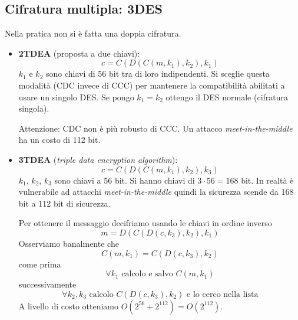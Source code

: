 \subsection{Cifratura multipla: 3DES}
Nella pratica non si è fatta una doppia cifratura. 
\begin{itemize}
    \item \textbf{2TDEA} (proposta a due chiavi):
        $$ c = C\left(D(C(m, k_1), k_2), k_1\right) $$
        $k_1$ e $k_2$ sono chiavi di 56 bit tra di loro indipendenti. Si sceglie questa modalità (CDC invece di CCC) per mantenere la compatibilità abilitati a usare un singolo DES. Se pongo $k_1 = k_2$ ottengo il DES normale (cifratura singola).
        
        {Attenzione}: CDC non è più robusto di CCC. Un attacco \emph{meet-in-the-middle} ha un costo di 112 bit.
    \item \textbf{3TDEA} (\textit{triple data encryption algorithm}):
        $$ c = C(D(C(m, k_1), k_2), k_3) $$
        $k_1$, $k_2$, $k_3$ sono chiavi a 56 bit. Si hanno chiavi di $3 \cdot 56 = 168$ bit. In realtà è vulnerabile ad attacchi \textit{meet-in-the-middle} quindi la sicurezza scende da 168 bit a 112 bit di sicurezza.
        
        Per ottenere il messaggio decifriamo usando le chiavi in ordine inverso
        $$m=D\left(C(D(c,k_3),k_2),k_1\right)$$
        Osserviamo banalmente che
        $$C(m,k_1)=C(D(c,k_3),k_2)$$
        come prima 
        $$\forall k_1 \text{ calcolo e salvo } C(m,k_1)$$
        successivamente
        $$\forall k_2,k_3 \text{ calcolo } C(D(c,k_3),k_2) \text{ e lo cerco nella lista}$$
        A livello di costo otteniamo $O\left(2^{56}+2^{112}\right)=O\left(2^{112}\right)$.
\end{itemize}

